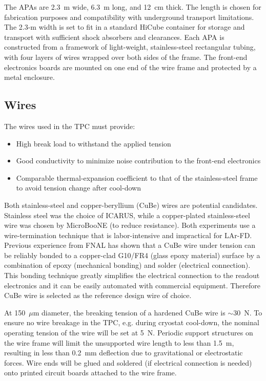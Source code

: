 The APAs are 2.3~m wide, 6.3~m long, and 12~cm thick. The length is chosen for fabrication purposes and compatibility with underground transport limitations. The 2.3-m width is set to fit in a standard HiCube container for storage and transport with sufficient shock absorbers and clearances. 
Each APA is constructed from a framework of light-weight, stainless-steel rectangular tubing, with four layers of wires wrapped over both sides of the frame. The front-end electronics boards are mounted on one end of the wire frame and protected by a metal enclosure.  

\subsection{Wires}

The wires used in the TPC must provide:
\begin{itemize}
\item High break load to withstand the applied tension 
\item Good conductivity to minimize noise contribution to the front-end electronics
\item Comparable thermal-expansion coefficient to that of the stainless-steel 
frame to avoid tension change after cool-down
\end{itemize}

Both stainless-steel and copper-beryllium (CuBe) wires are potential candidates.  
Stainless steel was the choice of ICARUS, while a copper-plated 
stainless-steel wire was chosen by MicroBooNE  (to reduce resistance).  Both experiments use a wire-termination 
technique that is labor-intensive and impractical for LAr-FD. Previous experience from FNAL \cite{FNAL-proto-APA} has shown that a CuBe wire under 
tension can be reliably bonded to a copper-clad G10/FR4 (glass epoxy material) surface by a combination of  epoxy (mechanical bonding) 
and solder (electrical connection).  This bonding technique greatly simplifies the electrical 
connection to the readout electronics and it can be easily automated 
with commercial equipment.  Therefore CuBe wire is 
selected as the reference design wire of choice.

At 150~$\mu$m diameter,  the breaking tension of a hardened CuBe wire is $\sim$30~N.  
To ensure no wire breakage in the TPC, e.g. during cryostat cool-down, the nominal operating tension of the wire will be set at 5~N.  Periodic support structures on the wire frame will
limit the unsupported wire length to less than 1.5~m, resulting in less than 0.2~mm deflection due to gravitational or electrostatic forces.  Wire ends will be glued and soldered (if electrical connection is needed) 
onto printed circuit boards attached to the wire frame.


